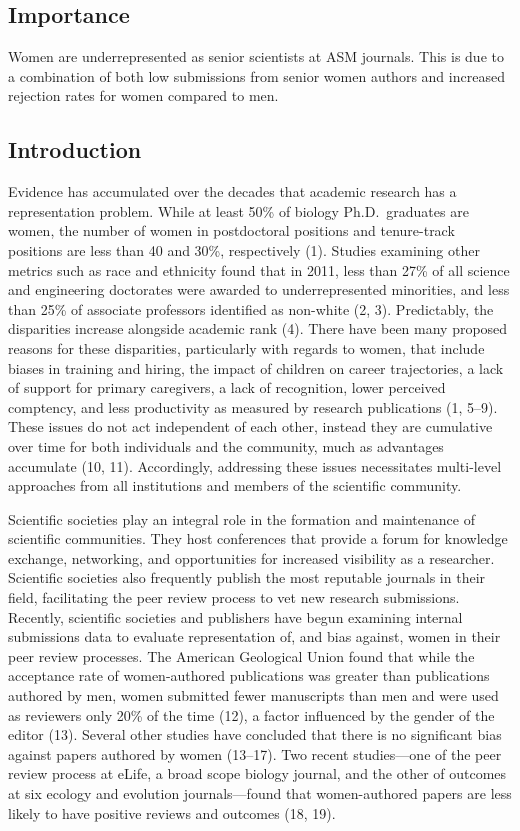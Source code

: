 \documentclass[11pt,]{article}
\begin{document}
\subsection{Importance}\label{importance}

Women are underrepresented as senior scientists at ASM journals. This is
due to a combination of both low submissions from senior women authors
and increased rejection rates for women compared to men.

\subsection{Introduction}\label{introduction}

Evidence has accumulated over the decades that academic research has a
representation problem. While at least 50\% of biology Ph.D.~graduates
are women, the number of women in postdoctoral positions and
tenure-track positions are less than 40 and 30\%, respectively (1).
Studies examining other metrics such as race and ethnicity found that in
2011, less than 27\% of all science and engineering doctorates were
awarded to underrepresented minorities, and less than 25\% of associate
professors identified as non-white (2, 3). Predictably, the disparities
increase alongside academic rank (4). There have been many proposed
reasons for these disparities, particularly with regards to women, that
include biases in training and hiring, the impact of children on career
trajectories, a lack of support for primary caregivers, a lack of
recognition, lower perceived comptency, and less productivity as
measured by research publications (1, 5--9). These issues do not act
independent of each other, instead they are cumulative over time for
both individuals and the community, much as advantages accumulate (10,
11). Accordingly, addressing these issues necessitates multi-level
approaches from all institutions and members of the scientific
community.

Scientific societies play an integral role in the formation and
maintenance of scientific communities. They host conferences that
provide a forum for knowledge exchange, networking, and opportunities
for increased visibility as a researcher. Scientific societies also
frequently publish the most reputable journals in their field,
facilitating the peer review process to vet new research submissions.
Recently, scientific societies and publishers have begun examining
internal submissions data to evaluate representation of, and bias
against, women in their peer review processes. The American Geological
Union found that while the acceptance rate of women-authored
publications was greater than publications authored by men, women
submitted fewer manuscripts than men and were used as reviewers only
20\% of the time (12), a factor influenced by the gender of the editor
(13). Several other studies have concluded that there is no significant
bias against papers authored by women (13--17). Two recent studies---one
of the peer review process at eLife, a broad scope biology journal, and
the other of outcomes at six ecology and evolution journals---found that
women-authored papers are less likely to have positive reviews and
outcomes (18, 19).
\end{document}
